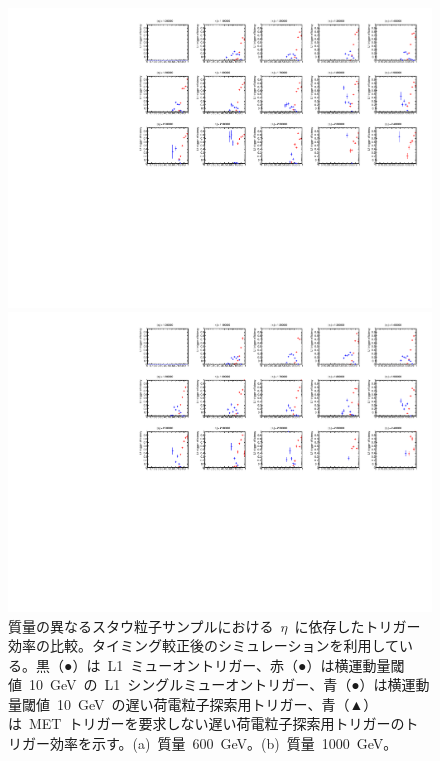 \begin{figure}[H]
    \begin{minipage}{0.49\hsize}
    \centering   
    \includegraphics[width=\textwidth,page=9]{img/rec/stau_600.pdf}
    \subcaption{}
    \end{minipage}
    \begin{minipage}{0.49\hsize}
    \centering   
    \includegraphics[width=\textwidth,page=9]{img/rec/stau_1000.pdf}
    \subcaption{}
    \end{minipage}
    \caption[質量の異なるスタウ粒子サンプルにおける~$\eta$~に依存したトリガー効率の比較]{質量の異なるスタウ粒子サンプルにおける~$\eta$~に依存したトリガー効率の比較。タイミング較正後のシミュレーションを利用している。黒（●）は~L1~ミューオントリガー、赤（●）は横運動量閾値~10~GeV~の~L1~シングルミューオントリガー、青（●）は横運動量閾値~10~GeV~の遅い荷電粒子探索用トリガー、青（▲）は~MET~トリガーを要求しない遅い荷電粒子探索用トリガーのトリガー効率を示す。(a)~質量~600~GeV。(b)~質量~1000~GeV。}\label{fig:trieta6}
\end{figure}
